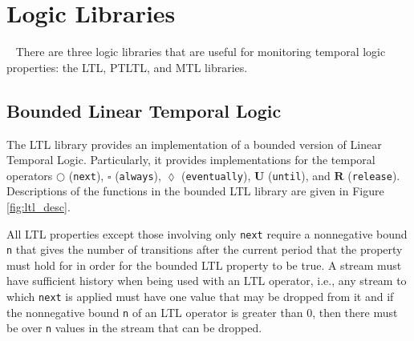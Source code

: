 \newcommand{\previous}{\overset{\leftarrow}{\bigcirc}}
\newcommand{\alwaysBeen}{\overset{\leftarrow}{\square}}
\newcommand{\eventuallyPrev}{\overset{\leftarrow}{\lozenge}}

\section{Logic Libraries}~\label{sec:logic}
There are three logic libraries that are useful for monitoring temporal logic
properties: the LTL, PTLTL, and MTL libraries.

\subsection{Bounded Linear Temporal Logic}
The LTL library provides an implementation of a bounded version of Linear
Temporal Logic. Particularly, it provides implementations for the temporal
operators $\bigcirc$ (\verb,next,), $\square$ (\verb,always,),
$\lozenge$ (\verb,eventually,), $\mathbf{U}$ (\verb,until,), and
$\mathbf{R}$ (\verb,release,). Descriptions of the functions in the
bounded LTL library are given in Figure \ref{fig:ltl_desc}.

All LTL properties except those involving only \verb,next,
require a nonnegative bound \verb,n, that gives the number of transitions
after the current period that the property must hold for in order
for the bounded LTL property to be true.
A stream must have sufficient history when being used with
an LTL operator, i.e., any stream to which \verb,next, is applied must
have one value that may be dropped from it and if the nonnegative bound
\verb,n, of an LTL operator is greater than 0, then there must be over
\verb,n, values in the stream that can be dropped.

